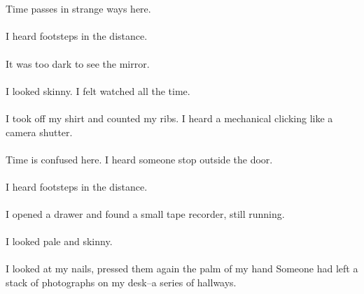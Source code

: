 \documentclass{article}
\begin{document}
    \section{}
    Time passes in strange ways here. \\\\I heard footsteps in the distance. \\\\It was too dark to see the mirror. \\\\I looked skinny. I felt watched all the time. \\\\I took off my shirt and counted my ribs. I heard a mechanical clicking like a camera shutter. \\\\Time is confused here. I heard someone stop outside the door. \\\\I heard footsteps in the distance. \\\\I opened a drawer and found a small tape recorder, still running. \\\\I looked pale and skinny. \\\\I looked at my nails, pressed them again the palm of my hand Someone had left a stack of photographs on my desk--a series of hallways. \\\\
    \newpage
    
\end{document}
